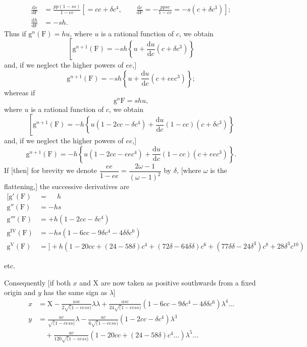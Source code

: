 \[
\begin{aligned}
\frac{\mathrm ds}{\mathrm d\mathrm F}
 &=\frac{pp(1-ss)}{1-ee}\left[=cc+\delta c^4,\qquad
 \frac{\mathrm dc}{\mathrm d\mathrm F}=-\frac{ppsc}{1-ee}=-s(c+\delta c^3)\right];\\
\frac{\mathrm dh}{\mathrm d\mathrm F}&=-sh.
\end{aligned}
\]
Thus if \(\mathrm g^n(\mathrm F)=hu\), where \(u\) is a rational function of \(c\), we obtain
\[
\left[\mathrm g^{n+1}(\mathrm F)=-sh\left\{u+\frac{\mathrm du}{\mathrm dc}(c+\delta c^3)\right\}\right.
\]
\noindent and, if we neglect the higher powers of \(ee\),]
\[
\mathrm g^{n+1}(\mathrm F)=-sh\left\{u+\frac{\mathrm du}{\mathrm dc}(c+eec^3)\right\};
\]
\noindent whereas if
\[
\mathrm g^n\mathrm F=shu,
\]
\noindent where \(u\) is a rational function of \(c\), we obtain
\[
\left[\mathrm g^{n+1}(\mathrm F)=-h\left\{u(1-2cc-\delta c^4)
 +\frac{\mathrm du}{\mathrm dc}(1-cc)(c+\delta c^3)\right\}\right.
\]
\noindent and, if we neglect the higher powers of \(ee\),]
\[
\mathrm g^{n+1}(\mathrm F)=-h\left\{u(1-2cc-eec^4)
 +\frac{\mathrm du}{\mathrm dc}(1-cc)(c+eec^3)\right\}.
\]
If [then] for brevity we denote
\(\dfrac{ee}{1-ee}=\dfrac{2\omega-1}{(\omega-1)^2}\) by \(\delta\),
[where \(\omega\) is the flattening,] the successive derivatives are
\[
\begin{aligned}
\mathopen{[}\mathrm g'(\mathrm F)&=\phantom{+}h\\
\mathrm g''(\mathrm F)&=-hs\\
\mathrm g'''(\mathrm F)&=+h(1-2cc-\delta c^4)\\
\mathrm g^{\mathrm{IV}}(\mathrm F)&=-hs(1-6cc-9\delta c^4-4\delta\delta c^6)\\
\mathrm g^{\mathrm V}(\mathrm F)&={]}+h(1-20cc+(24-58\delta)c^4+(72\delta-64\delta\delta)c^6
 +(77\delta\delta-24\delta^3)c^8+28\delta^3c^{10})
\end{aligned}
\]
\centerline{etc.}
\medskip

Consequently [if both \(x\) and \(\mathrm X\) are now taken as positive southwards from
a fixed origin and \(y\) has the same sign as \(\lambda\)]
\[
\begin{aligned}
x&=\mathrm X-\frac{asc}{2\surd(1-eess)}\lambda\lambda
 +\frac{asc}{24\surd(1-eess)}(1-6cc-9\delta c^4-4\delta\delta c^6)\lambda^4\ldots\\
y&=\frac{ac}{\surd(1-eess)}\lambda
 -\frac{ac}{6\surd(1-eess)}(1-2cc-\delta c^4)\lambda^3\\
 &\quad+\frac{ac}{120\surd(1-eess)}(1-20cc+(24-58\delta)c^4\ldots)\lambda^5\ldots
\end{aligned}
\]

